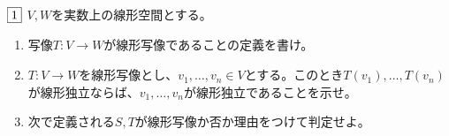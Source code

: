 \begin{tcolorbox} %
	$\fbox{1}$ $V, W$を実数上の線形空間とする。
\begin{enumerate}
	\item 写像$T\colon V\to W$が線形写像であることの定義を書け。
	\item $T\colon V\to W$を線形写像とし、$v_1, \ldots, v_n\in V$とする。このとき$T(v_1), \ldots, T(v_n)$が線形独立ならば、$v_1, \ldots, v_n$が線形独立であることを示せ。
	\item 次で定義される$S, T$が線形写像か否か理由をつけて判定せよ。
\end{enumerate}
\end{tcolorbox}


